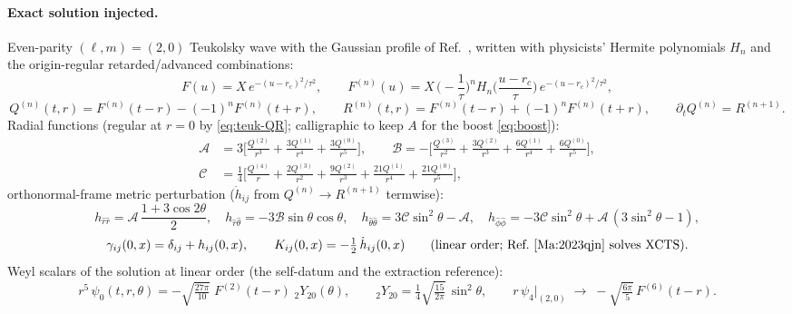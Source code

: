 \paragraph{Exact solution injected.}
Even-parity $(\ell,m)=(2,0)$ Teukolsky wave \cite{Teukolsky:1982nz} with the
Gaussian profile of Ref.~\cite{Ma:2023qjn}, written with physicists' Hermite
polynomials $H_n$ and the origin-regular retarded/advanced combinations:
\begin{equation}
F(u) = X\,e^{-(u-r_c)^2/\tau^2},
\qquad
F^{(n)}(u) = X\,\Big(\!-\frac{1}{\tau}\Big)^{\!n}
 H_n\!\Big(\frac{u-r_c}{\tau}\Big)\,e^{-(u-r_c)^2/\tau^2},
\label{eq:teuk-F}
\end{equation}
\begin{equation}
Q^{(n)}(t,r) = F^{(n)}(t-r) - (-1)^n F^{(n)}(t+r),
\qquad
R^{(n)}(t,r) = F^{(n)}(t-r) + (-1)^n F^{(n)}(t+r),
\qquad
\partial_t Q^{(n)} = R^{(n+1)} .
\label{eq:teuk-QR}
\end{equation}
Radial functions (regular at $r=0$ by \eqref{eq:teuk-QR}; calligraphic to
keep $A$ for the boost \eqref{eq:boost}):
\begin{align}
\mathcal A &= 3\Big[\frac{Q^{(2)}}{r^3} + \frac{3Q^{(1)}}{r^4}
 + \frac{3Q^{(0)}}{r^5}\Big],
\qquad
\mathcal B = -\Big[\frac{Q^{(3)}}{r^2} + \frac{3Q^{(2)}}{r^3}
 + \frac{6Q^{(1)}}{r^4} + \frac{6Q^{(0)}}{r^5}\Big],
\nonumber\\
\mathcal C &= \frac14\Big[\frac{Q^{(4)}}{r} + \frac{2Q^{(3)}}{r^2}
 + \frac{9Q^{(2)}}{r^3} + \frac{21Q^{(1)}}{r^4} + \frac{21Q^{(0)}}{r^5}\Big],
\label{eq:teuk-ABC}
\end{align}
orthonormal-frame metric perturbation ($\dot h_{ij}$ from
$Q^{(n)}\!\to\!R^{(n+1)}$ termwise):
\begin{equation}
h_{\hat r\hat r} = \mathcal A\,\frac{1+3\cos 2\theta}{2},
\quad
h_{\hat r\hat\theta} = -3\mathcal B\sin\theta\cos\theta,
\quad
h_{\hat\theta\hat\theta} = 3\mathcal C\sin^2\theta - \mathcal A,
\quad
h_{\hat\phi\hat\phi} = -3\mathcal C\sin^2\theta
 + \mathcal A\,(3\sin^2\theta - 1),
\label{eq:teuk-metric}
\end{equation}
\begin{equation}
\gamma_{ij}(0,x) = \delta_{ij} + h_{ij}(0,x),
\qquad
K_{ij}(0,x) = -\tfrac12\,\dot h_{ij}(0,x)
\qquad
(\text{linear order; Ref.~\cite{Ma:2023qjn} solves XCTS}).
\label{eq:teuk-id}
\end{equation}
Weyl scalars of the solution at linear order (the self-datum and the
extraction reference):
\begin{equation}
r^5\,\psi_0(t,r,\theta) = -\sqrt{\tfrac{27\pi}{10}}\;F^{(2)}(t-r)\;
 {}_{2}Y_{20}(\theta),
\qquad
{}_{2}Y_{20} = \tfrac14\sqrt{\tfrac{15}{2\pi}}\,\sin^2\theta,
\qquad
r\,\psi_4\big|_{(2,0)} \;\to\; -\sqrt{\tfrac{6\pi}{5}}\,F^{(6)}(t-r).
\label{eq:teuk-psi0}
\end{equation}

